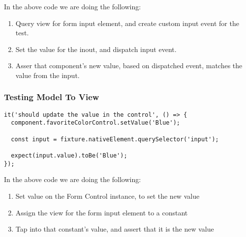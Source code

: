 In the above code we are doing the following: 
\begin{enumerate}
  \item Query view for form input element, and create custom input event for
  the test.
  \item Set the value for the inout, and dispatch input event.
  \item Asser that component's new value, based on dispatched event, matches
  the value from the input. 
\end{enumerate}

\subsubsection{ Testing Model To View }

\begin{lstlisting}
it('should update the value in the control', () => {
  component.favoriteColorControl.setValue('Blue');

  const input = fixture.nativeElement.querySelector('input');

  expect(input.value).toBe('Blue');
});
\end{lstlisting}

In the above code we are doing the following: 
\begin{enumerate}
  \item Set value on the Form Control instance, to set the new value 
  \item Assign the view for the form input element to a constant
  \item Tap into that constant's value, and assert that it is the new value
\end{enumerate}


